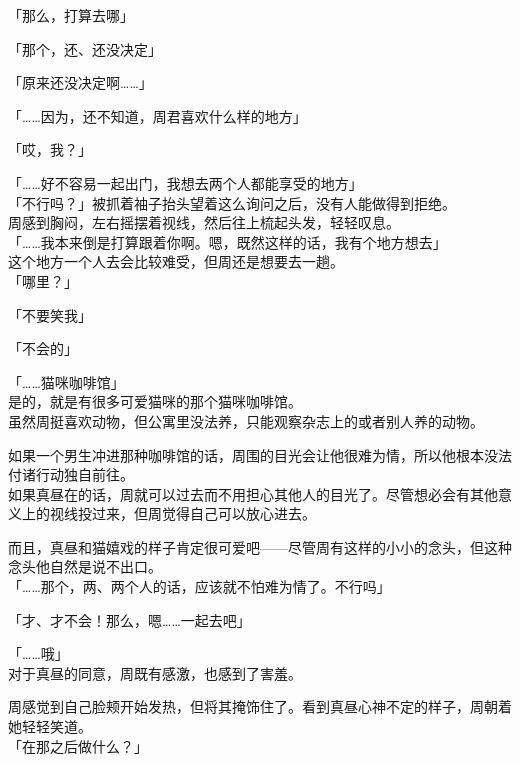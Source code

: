 「那么，打算去哪」

「那个，还、还没决定」

「原来还没决定啊……」

「……因为，还不知道，周君喜欢什么样的地方」

「哎，我？」

「……好不容易一起出门，我想去两个人都能享受的地方」\\

「不行吗？」被抓着袖子抬头望着这么询问之后，没有人能做得到拒绝。\\

周感到胸闷，左右摇摆着视线，然后往上梳起头发，轻轻叹息。\\

「……我本来倒是打算跟着你啊。嗯，既然这样的话，我有个地方想去」\\

这个地方一个人去会比较难受，但周还是想要去一趟。\\

「哪里？」

「不要笑我」

「不会的」

「……猫咪咖啡馆」\\

是的，就是有很多可爱猫咪的那个猫咪咖啡馆。\\

虽然周挺喜欢动物，但公寓里没法养，只能观察杂志上的或者别人养的动物。

如果一个男生冲进那种咖啡馆的话，周围的目光会让他很难为情，所以他根本没法付诸行动独自前往。\\

如果真昼在的话，周就可以过去而不用担心其他人的目光了。尽管想必会有其他意义上的视线投过来，但周觉得自己可以放心进去。

而且，真昼和猫嬉戏的样子肯定很可爱吧——尽管周有这样的小小的念头，但这种念头他自然是说不出口。\\

「……那个，两、两个人的话，应该就不怕难为情了。不行吗」

「才、才不会！那么，嗯……一起去吧」

「……哦」\\

对于真昼的同意，周既有感激，也感到了害羞。

周感觉到自己脸颊开始发热，但将其掩饰住了。看到真昼心神不定的样子，周朝着她轻轻笑道。\\

「在那之后做什么？」


